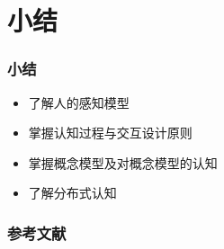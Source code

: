 \documentclass{beamer}
\begin{document}
\section{小结}
\begin{frame}
	\frametitle{小结}
	\begin{itemize}
		\item 了解人的感知模型
		\item 掌握认知过程与交互设计原则
		\item 掌握概念模型及对概念模型的认知
		\item 了解分布式认知
	\end{itemize}
\end{frame}
 
\begin{frame}
	\frametitle{参考文献}
	
	
\end{frame}
\end{document}
